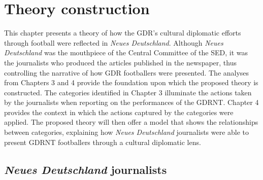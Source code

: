\chapter{Theory construction\label{cha:theory}}

This chapter presents a theory of how the GDR’s cultural diplomatic efforts through football were reflected in \textit{Neues Deutschland}. Although \textit{Neues Deutschland} was the mouthpiece of the Central Committee of the SED, it was the journalists who produced the articles published in the newspaper, thus controlling the narrative of how GDR footballers were presented.   The analyses from Chapters 3 and 4 provide the foundation upon which the proposed theory is constructed. The categories identified in Chapter 3 illuminate the actions taken by the journalists when reporting on the performances of the GDRNT. Chapter 4 provides the context in which the actions captured by the categories were applied. The proposed theory will then offer a model that shows the relationships between categories, explaining how \textit{Neues Deutschland} journalists were able to present GDRNT footballers through a cultural diplomatic lens.

\section*{\textit{Neues Deutschland} journalists}

